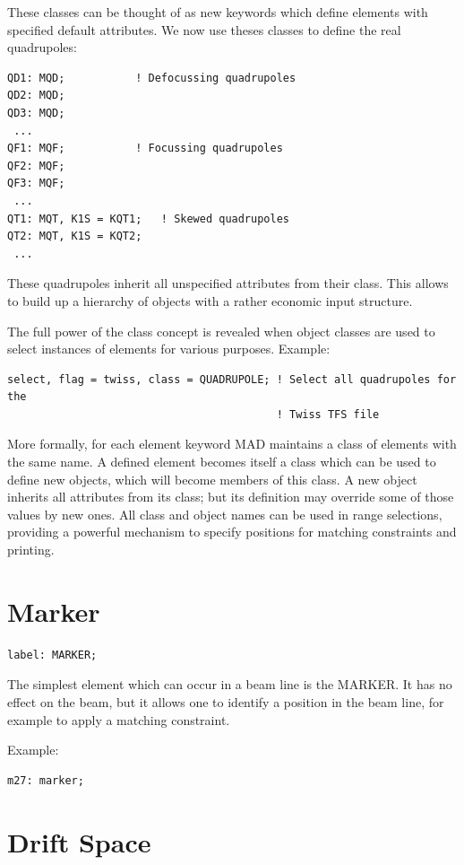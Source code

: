 These classes can be thought of as new keywords which define elements
with specified default attributes. We now use theses classes to define
the real quadrupoles:  
\begin{verbatim}
QD1: MQD;           ! Defocussing quadrupoles
QD2: MQD;
QD3: MQD;
 ...
QF1: MQF;           ! Focussing quadrupoles
QF2: MQF;
QF3: MQF;
 ...
QT1: MQT, K1S = KQT1;   ! Skewed quadrupoles
QT2: MQT, K1S = KQT2;
 ...
\end{verbatim} 

These quadrupoles inherit all unspecified attributes from their
class. This allows to build up a hierarchy of objects with a rather
economic input structure.  

The full power of the class concept is revealed when object classes are
used to select instances of elements for various purposes. Example:  
\begin{verbatim}
select, flag = twiss, class = QUADRUPOLE; ! Select all quadrupoles for the
                                          ! Twiss TFS file
\end{verbatim}

More formally, for each element keyword MAD maintains a class of
elements with the same name. A defined element becomes itself a class
which can be used to define new objects, which will become members of
this class. A new object inherits all attributes from its class; but its
definition may override some of those values by new ones. All class and
object names can be used in range selections, providing a powerful
mechanism to specify positions for matching constraints and printing.  


%
\section{Marker}
\label{sec:marker}

\begin{verbatim}
label: MARKER;
\end{verbatim} 
The simplest element which can occur in a beam line is the MARKER. It
has no effect on the beam, but it allows one to identify a position in
the beam line, for example to apply a matching constraint.  

Example: 
\begin{verbatim}
m27: marker;
\end{verbatim}


%
\section{Drift Space}
\label{sec:drift}

